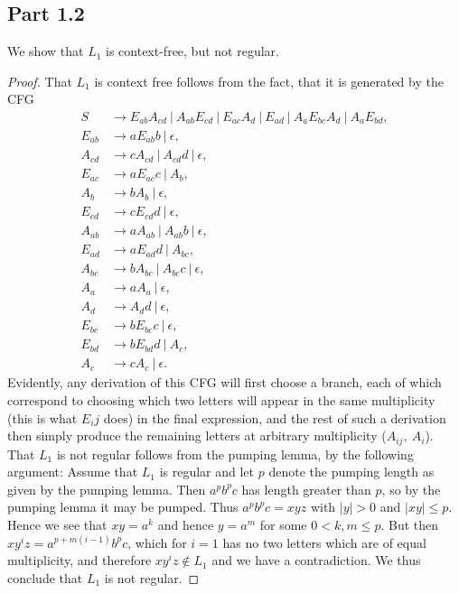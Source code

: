 \documentclass[a4paper,11pt]{article}
\newcommand{\abs}[1]{\left\lvert #1 \right\rvert}
\newcommand{\pipe}{\ \vert \ }
\numberwithin{equation}{section}
\begin{document}
		\subsection*{Part 1.2}
		We show that $ L_1 $ is context-free, but not regular.
		\begin{proof}
			That $ L_1 $ is context free follows from the fact, that it is generated by the CFG
			\begin{equation}
			\begin{aligned}
			S&\to E_{ab}A_{cd}\pipe	A_{ab}E_{cd}\pipe E_{ac}A_d\pipe E_{ad}\pipe A_aE_{bc}A_d\pipe A_aE_{bd},\\
			E_{ab}&\to aE_{ab}b\pipe \epsilon,\\	
			A_{cd}&\to cA_{cd}\pipe A_{cd}d\pipe\epsilon,\\
			E_{ac}&\to aE_{ac}c\pipe A_b,\\
			A_b&\to bA_b\pipe \epsilon,\\
			E_{cd}&\to cE_{cd}d\pipe\epsilon,\\
			A_{ab}&\to aA_{ab}\pipe A_{ab}b\pipe\epsilon,\\
			E_{ad}&\to aE_{ad}d\pipe A_{bc},\\
			A_{bc}&\to bA_{bc}\pipe A_{bc}c\pipe\epsilon,\\
			A_a&\to aA_a\pipe\epsilon,\\
			A_d&\to A_dd\pipe\epsilon,\\
			E_{bc}&\to bE_{bc}c\pipe\epsilon,\\
			E_{bd}&\to bE_{bd}d\pipe A_c,\\
			A_c&\to cA_c\pipe\epsilon.	
			\end{aligned}
			\end{equation}
			Evidently, any derivation of this CFG will first choose a branch, each of which correspond to choosing which two letters will appear in the same multiplicity (this is what $ E_ij $ does) in the final expression, and the rest of such a derivation then simply produce the remaining letters at arbitrary multiplicity ($ A_{ij},\ A_i $).
			That $ L_1 $ is not regular follows from the pumping lemma, by the following argument: Assume that $ L_1 $ is regular and let $ p $ denote the pumping length as given by the pumping lemma. Then $ a^pb^pc $ has length greater than $ p $, so by the pumping lemma it may be pumped. Thus $ a^pb^pc=xyz $ with $ \abs{y}>0 $ and $ \abs{xy}\leq p $. Hence we see that $ xy=a^k $ and hence $ y=a^m $ for some $ 0<k,m\leq p $. But then $ xy^iz=a^{p+m(i-1)}b^pc $, which for $ i=1 $ has no two letters which are of equal multiplicity, and therefore $ xy^iz\notin L_1 $ and we have a contradiction. We thus conclude that $ L_1 $ is not regular.
		\end{proof}
\end{document}
